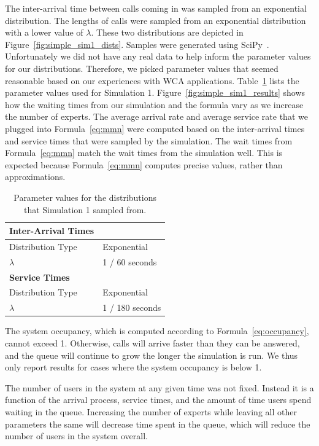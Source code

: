The inter-arrival time between calls coming in was sampled from an exponential
distribution.
The lengths of calls were sampled from an exponential distribution with
a lower value of $\lambda$.
These two distributions are depicted in Figure~\ref{fig:simple_sim1_dists}.
Samples were generated using SciPy~\cite{scipy}.
Unfortunately we did not have any real data to help inform the parameter values
for our distributions.
Therefore, we picked parameter values that seemed reasonable based on our
experiences with WCA applications.
Table~\ref{tab:sim1_params} lists the parameter values used for Simulation 1.
Figure~\ref{fig:simple_sim1_results} shows how the waiting times from our
simulation and the formula vary as we increase the number of experts.
The average arrival rate and average service rate that we plugged into
Formula~\ref{eq:mmn} were computed based on the inter-arrival times and service
times that were sampled by the simulation.
The wait times from Formula~\ref{eq:mmn} match the wait times from the
simulation well.
This is expected because Formula~\ref{eq:mmn} computes precise values, rather
than approximations.

\begin{table}
  \begin{tabular}{|l|l|}
    \hline
    \textbf{Inter-Arrival Times} & \\
    \hline
    Distribution Type & Exponential\\
    \hline
    $\lambda$ & 1 / 60 seconds\\
    \hline
    \hline
    \textbf{Service Times} & \\
    \hline
    Distribution Type & Exponential\\
    \hline
    $\lambda$ & 1 / 180 seconds\\
    \hline
  \end{tabular}
  \caption{Parameter values for the distributions that Simulation 1 sampled
    from.}\label{tab:sim1_params}
\end{table}

The system occupancy, which is computed according to Formula~\ref{eq:occupancy},
cannot exceed 1.
Otherwise, calls will arrive faster than they can be answered, and the queue
will continue to grow the longer the simulation is run.
We thus only report results for cases where the system occupancy is below 1.

The number of users in the system at any given time was not fixed.
Instead it is a function of the arrival process, service times, and the amount
of time users spend waiting in the queue.
Increasing the number of experts while leaving all other parameters the same
will decrease time spent in the queue, which will reduce the number of users in
the system overall.

